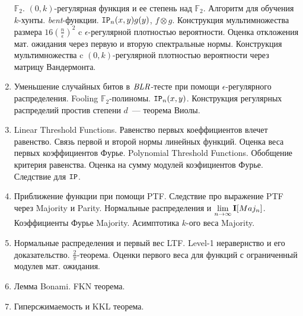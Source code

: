 \begin{enumerate}
        $\mathbb{F}_2$. $(0, k)$-регулярная функция и ее степень над $\mathbb{F}_2$. Алгоритм для обучения
        $k$-хунты. \textit{bent}-функции. $\mathtt{IP}_n(x, y) g(y)$, $f \otimes g$. Конструкция мультимножества размера $16
        (\frac{n}{\epsilon})^2$ c $\epsilon$-регулярной плотностью вероятности. Оценка откложения мат. ожидания через первую
        и вторую спектральные нормы. Конструкция мультимножества c $(0, k)$-регулярной плотностью вероятности через матрицу
        Вандермонта.
    \item Уменьшение случайных битов в $\mathit{BLR}$-тесте при помощи $\epsilon$-регулярного распределения. Fooling
        $\mathbb{F}_2$-полиномы. $\mathtt{IP}_n(x, y)$. Конструкция регулярных распределий простив степени $d$~--- теорема Виолы.
    \item Linear Threshold Functions. Равенство первых коеффициентов влечет равенство. Связь первой и второй нормы линейных
        функций. Оценка веса первых коэффициентов Фурье. Polynomial Threshold Functions. Обобщение критерия равенства. Оценка
        на сумму модулей коэфициентов Фурье. Следствие для $\mathtt{IP}$.
    \item Приближение функции при помощи PTF. Следствие про выражение PTF через Majority и Parity. Нормальные распределения и
        $\lim\limits_{n \to \infty} \mathbf{I}[Maj_n]$. Коэффициенты Фурье Majority. Асимптотика $k$-ого веса Majority.
    \item Нормальные распределения и первый вес LTF. Level-1 неравернство и его
        доказательство. $\frac{2}{\pi}$-теорема. Оценки первого веса для функций с ограниченный модулев мат. ожидания.
    \item Лемма Bonami. FKN теорема.
    \item Гиперсжимаемость и KKL теорема.
\end{enumerate}
